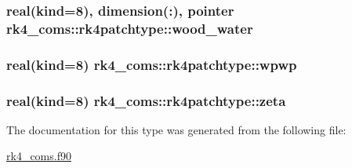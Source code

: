 \subsubsection[{wood\+\_\+water}]{\setlength{\rightskip}{0pt plus 5cm}real(kind=8), dimension(\+:), pointer rk4\+\_\+coms\+::rk4patchtype\+::wood\+\_\+water}\label{structrk4__coms_1_1rk4patchtype_a4c6e061bf65085ce6445671b92c3ace8}
\hypertarget{structrk4__coms_1_1rk4patchtype_a91728bf053cbc9d1a5e1b0d4e6624b64}{}
\subsubsection[{wpwp}]{\setlength{\rightskip}{0pt plus 5cm}real(kind=8) rk4\+\_\+coms\+::rk4patchtype\+::wpwp}\label{structrk4__coms_1_1rk4patchtype_a91728bf053cbc9d1a5e1b0d4e6624b64}
\hypertarget{structrk4__coms_1_1rk4patchtype_a35665ce92058b1d6f19447a08fd3b29f}{}
\subsubsection[{zeta}]{\setlength{\rightskip}{0pt plus 5cm}real(kind=8) rk4\+\_\+coms\+::rk4patchtype\+::zeta}\label{structrk4__coms_1_1rk4patchtype_a35665ce92058b1d6f19447a08fd3b29f}


The documentation for this type was generated from the following file\+:\begin{DoxyCompactItemize}
\item 
\hyperlink{rk4__coms_8f90}{rk4\+\_\+coms.\+f90}\end{DoxyCompactItemize}
